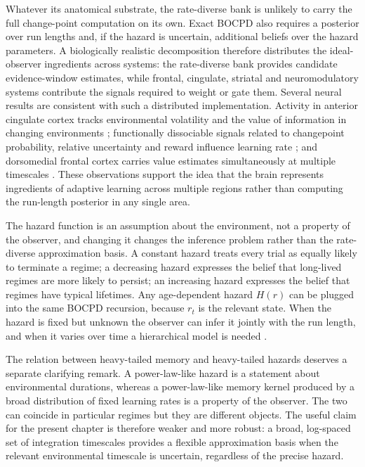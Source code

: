 Whatever its anatomical substrate, the rate-diverse bank is unlikely to carry the full change-point computation on its own. Exact BOCPD also requires a posterior over run lengths and, if the hazard is uncertain, additional beliefs over the hazard parameters. A biologically realistic decomposition therefore distributes the ideal-observer ingredients across systems: the rate-diverse bank provides candidate evidence-window estimates, while frontal, cingulate, striatal and neuromodulatory systems contribute the signals required to weight or gate them. Several neural results are consistent with such a distributed implementation. Activity in anterior cingulate cortex tracks environmental volatility and the value of information in changing environments \citep{Behrens2007}; functionally dissociable signals related to changepoint probability, relative uncertainty and reward influence learning rate \citep{McGuire2014}; and dorsomedial frontal cortex carries value estimates simultaneously at multiple timescales \citep{Meder2017}. These observations support the idea that the brain represents ingredients of adaptive learning across multiple regions rather than computing the run-length posterior in any single area.

The hazard function is an assumption about the environment, not a property of the observer, and changing it changes the inference problem rather than the rate-diverse approximation basis. A constant hazard treats every trial as equally likely to terminate a regime; a decreasing hazard expresses the belief that long-lived regimes are more likely to persist; an increasing hazard expresses the belief that regimes have typical lifetimes. Any age-dependent hazard $H(r)$ can be plugged into the same BOCPD recursion, because $r_t$ is the relevant state. When the hazard is fixed but unknown the observer can infer it jointly with the run length, and when it varies over time a hierarchical model is needed \citep{Wilson2010}.

The relation between heavy-tailed memory and heavy-tailed hazards deserves a separate clarifying remark. A power-law-like hazard is a statement about environmental durations, whereas a power-law-like memory kernel produced by a broad distribution of fixed learning rates is a property of the observer. The two can coincide in particular regimes but they are different objects. The useful claim for the present chapter is therefore weaker and more robust: a broad, log-spaced set of integration timescales provides a flexible approximation basis when the relevant environmental timescale is uncertain, regardless of the precise hazard.

